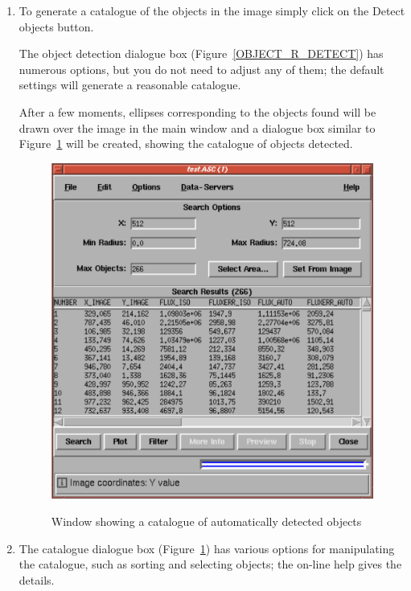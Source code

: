 \documentclass[twoside,11pt]{starlink}
\begin{document}
\begin{enumerate}
  \item To generate a catalogue of the objects in the image simply
   click on the \textsf{Detect objects} button.

   The object detection dialogue box (Figure~\ref{OBJECT_R_DETECT}) has
   numerous options, but you do not need to adjust any of them; the
   default settings will generate a reasonable catalogue.

   After a few moments, ellipses corresponding to the objects found will
   be drawn over the image in the main window and a dialogue box similar
   to Figure~\ref{OBJECT_R_CAT} will be created, showing the catalogue of
   objects detected.

  \begin{figure}[htbp]
     \centering
     \includegraphics[totalheight=3.75in]{sc17_object_r_cat}
     \begin{quote}
     \caption{Window showing a catalogue of automatically detected objects
     \label{OBJECT_R_CAT} }
     \end{quote}
  \end{figure}

  \item The catalogue dialogue box (Figure~\ref{OBJECT_R_CAT}) has various
   options for manipulating the catalogue, such as sorting and selecting
   objects; the on-line help gives the details.


\end{enumerate}
\end{document}
